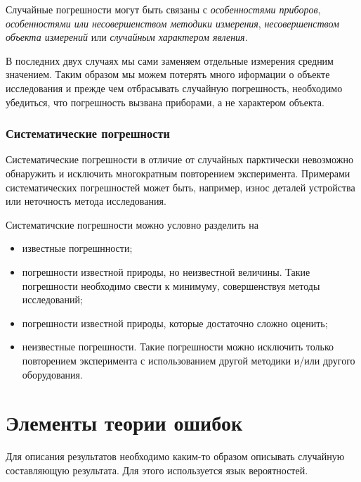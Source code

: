 \documentclass[12pt]{article}
\begin{document}
        Случайные погрешности могут быть связаны с \textit{особенностями приборов},
        \textit{особенностями или несовершенством методики измерения},
        \textit{несовершенством объекта измерений} или \textit{случайным характером явления}.

        В последних двух случаях мы сами заменяем отдельные измерения средним значением.
        Таким образом мы можем потерять много иформации о объекте исследования и
        прежде чем отбрасывать случайную погрешность, необходимо убедиться, что
        погрешность вызвана приборами, а не характером объекта.

      \subsubsection{Систематические погрешности}

        Систематические погрешности в отличие от случайных парктически невозможно
        обнаружить и исключить многократным повторением эксперимента. Примерами систематических
        погрешностей может быть, например, износ деталей устройства или неточность
        метода исследования.

        Систематичские погрешности можно условно разделить на

        \begin{itemize}

          \item известные погрешнности;

          \item погрешности известной природы, но неизвестной величины. Такие погрешности
          необходимо свести к минимуму, совершенствуя методы исследований;

          \item погрешности известной природы, которые достаточно сложно оценить;

          \item неизвестные погрешности. Такие погрешности можно исключить только
          повторением эксперимента с использованием другой методики и/или другого
          оборудования.

        \end{itemize}

  \section{Элементы теории ошибок}

    Для описания результатов необходимо каким-то образом описывать случайную
    составляющую результата. Для этого используется язык вероятностей.
\end{document}
